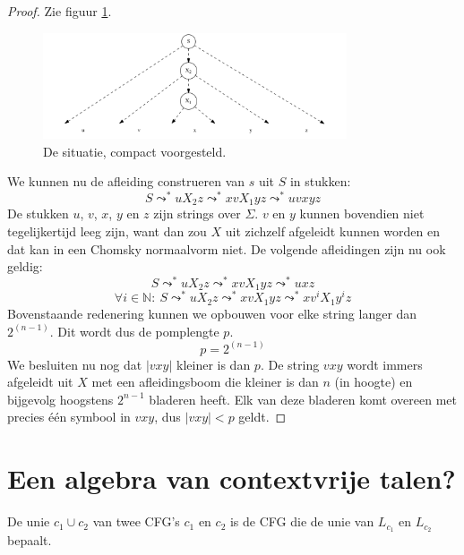 \documentclass[main.tex]{subfiles}
\begin{document}
\begin{st}
\begin{proof}
    Zie figuur \ref{fig:afleidingsboom-compact}.
    \begin{figure}[H]
      \centering
      \includegraphics[width=0.8\textwidth]{assets/pompend-lemma-herhaling.png}      
      \caption{De situatie, compact voorgesteld.}
      \label{fig:afleidingsboom-compact}
    \end{figure}
    We kunnen nu de afleiding construeren van $s$ uit $S$ in stukken:
    \[ S \leadsto^{*} uX_{2}z \leadsto^{*} xvX_{1}yz \leadsto^{*} uvxyz \]
    De stukken $u$, $v$, $x$, $y$ en $z$ zijn strings over $\Sigma$.
    $v$ en $y$ kunnen bovendien niet tegelijkertijd leeg zijn, want dan zou $X$ uit zichzelf afgeleidt kunnen worden en dat kan in een Chomsky normaalvorm niet.
    De volgende afleidingen zijn nu ook geldig:
    \[ S \leadsto^{*} uX_{2}z \leadsto^{*} xvX_{1}yz \leadsto^{*} uxz \]
    \[ \forall i \in \mathbb{N}:\ S \leadsto^{*} uX_{2}z \leadsto^{*} xvX_{1}yz \leadsto^{*} xv^{i}X_{1}y^{i}z \]
    Bovenstaande redenering kunnen we opbouwen voor elke string langer dan $2^{(n-1)}$.
    Dit wordt dus de pomplengte $p$.
    \[ p = 2^{(n-1)} \]
    We besluiten nu nog dat $|vxy|$ kleiner is dan $p$.
    De string $vxy$ wordt immers afgeleidt uit $X$ met een afleidingsboom die kleiner is dan $n$ (in hoogte) en bijgevolg hoogstens $2^{n-1}$ bladeren heeft.
    Elk van deze bladeren komt overeen met precies \'e\'en symbool in $vxy$, dus $|vxy| < p$ geldt.
  \end{proof}
\end{st}

\section{Een algebra van contextvrije talen?}


\begin{de}
  De unie $c_{1} \cup c_{2}$ van twee CFG's $c_{1}$ en $c_{2}$ is de CFG die de unie van $L_{c_{1}}$ en $L_{c_{2}}$ bepaalt.
\end{de}
\end{document}
